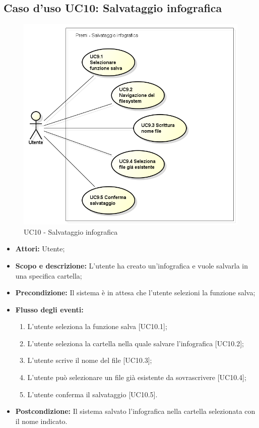 \subsection{Caso d'uso UC10: Salvataggio infografica}
\begin{figure}[h] 
	\centering 
	\includegraphics[scale=0.45] {img/UC10.png} 
	\caption{UC10 - Salvataggio infografica} 
\end{figure}

\begin{itemize}
	\item \textbf{Attori:} Utente;
	\item \textbf{Scopo e descrizione:} L'utente ha creato un'\gls{infografica} e vuole salvarla in una specifica cartella;
	\item \textbf{Precondizione:} Il sistema è in attesa che l'utente selezioni la funzione salva;
	\item \textbf{Flusso degli eventi:}
	\begin{enumerate}
		\item L'utente seleziona la funzione salva [UC10.1];
		\item L'utente seleziona la cartella nella quale salvare l'\gls{infografica} [UC10.2];
		\item L'utente scrive il nome del file [UC10.3];
		\item L'utente può selezionare un file già esistente da sovrascrivere [UC10.4];
		\item L'utente conferma il salvataggio [UC10.5].
	\end{enumerate}
	\item \textbf{Postcondizione:} Il sistema salvato l'\gls{infografica} nella cartella selezionata con il nome indicato.
\end{itemize}

